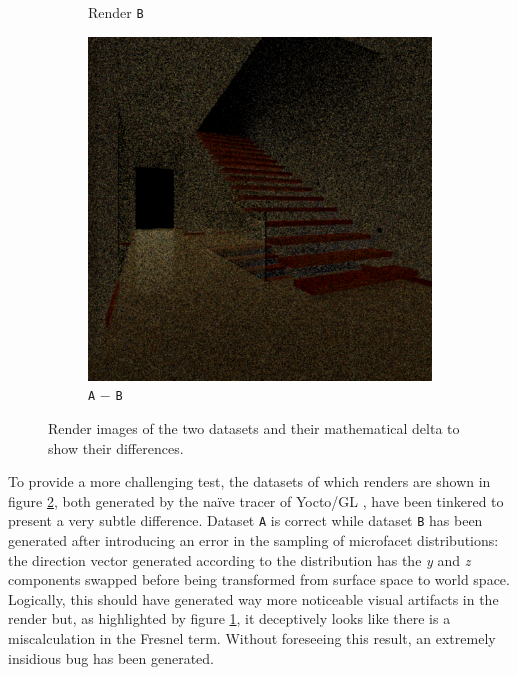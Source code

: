 \begin{figure}
\begin{subfigure}[t]{0.32\linewidth}
		\caption{Render \texttt{B}}
	\end{subfigure}
	\begin{subfigure}[t]{0.32\linewidth}
		\includegraphics[width=\textwidth]{chapters/chapter_results/render2difference}
		\caption{\texttt{A} $-$ \texttt{B}}
		\label{render2difference}
	\end{subfigure}

	\caption{Render images of the two datasets and their mathematical delta to show their differences.}
	\label{couple2render}
\end{figure}

To provide a more challenging test, the datasets of which renders are shown in figure \ref{couple2render}, both generated by the na\"ive tracer of Yocto/GL \cite{pellacini2019yocto}, have been tinkered to present a very subtle difference. Dataset \texttt{A} is correct while dataset \texttt{B} has been generated after introducing an error in the sampling of microfacet distributions: the direction vector generated according to the distribution has the \textit{y} and \textit{z} components swapped before being transformed from surface space to world space. Logically, this should have generated way more noticeable visual artifacts in the render but, as highlighted by figure \ref{render2difference}, it deceptively looks like there is a miscalculation in the Fresnel term. Without foreseeing this result, an extremely insidious bug has been generated.


